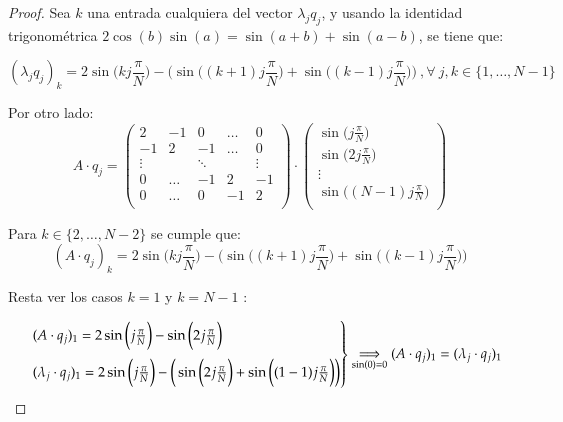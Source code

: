 \documentclass{endm}
\begin{document}
\begin{proof}
Sea $k$ una entrada cualquiera del vector $\lambda_{j}q_{j}$, y usando la identidad
trigonom\'etrica $2\cos{(b)}\sin{(a)} = \sin{(a+b)} + \sin{(a-b)}$, se tiene que: 

\begin{equation*}
    (\lambda_{j}q_{j})_{k} = 2\sin{\bigg(kj\frac{\pi}{N}\bigg)} - \bigg(\sin{\bigg((k+1)j\frac{\pi}{N}\bigg)} + \sin{\bigg((k-1)j\frac{\pi}{N}\bigg)} \bigg) 
    \ , \forall \ j,k \in \{1,\dots,N-1\}
\end{equation*}

Por otro lado:
\begin{equation*}
    A\cdot{q_{j}} = \begin{pmatrix}
        2 & -1 & 0 & \dots & 0 \\
        -1 & 2 & -1 & \dots & 0 \\
        \vdots & &\ddots & & \vdots \\
        0 & \dots & -1 & 2 & -1 \\
        0 & \dots & 0 & -1 & 2 \\
    \end{pmatrix}
    \cdot 
    \begin{pmatrix}
         \sin{\bigg(j\frac{\pi}{N}\bigg)}\\
        \sin{\bigg(2j\frac{\pi}{N}\bigg)}\\
        \vdots\\
        \sin{\bigg((N-1)j\frac{\pi}{N}\bigg)}\\
    \end{pmatrix}
\end{equation*}

Para $k \in \{ 2,\dots, N-2 \}$ se cumple que: 
\begin{equation*}
    (A\cdot q_{j})_{k} = 2\sin{\bigg(kj\frac{\pi}{N}\bigg)} -
    \bigg(\sin{\bigg((k+1)j\frac{\pi}{N}\bigg)} + \sin{\bigg((k-1)j\frac{\pi}{N}\bigg)}
    \bigg) 
\end{equation*}

Resta ver los casos $k = 1$ y $k = N-1$ : 

\begin{equation*}
   \begin{rcases}
    & (A\cdot q_{j})_{1}  = 2 \sin{\bigg(j\frac{\pi}{N}\bigg)} -
    \sin{\bigg(2j\frac{\pi}{N}\bigg)} \\
    & (\lambda_{j}\cdot q_{j})_{1} = 2 \sin{\bigg(j\frac{\pi}{N}\bigg)} - 
    \bigg( \sin{\bigg(2j\frac{\pi}{N}\bigg)} + \sin{\bigg((1-1)j\frac{\pi}{N}\bigg)}
    \bigg)
   \end{rcases} \underset{\sin(0) = 0}{\Longrightarrow} (A\cdot q_{j})_{1} = (\lambda_{j}\cdot q_{j})_{1} 
\end{equation*}


\end{proof}
\end{document}
